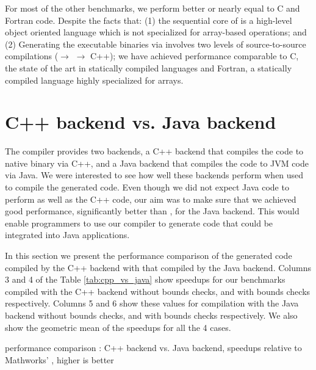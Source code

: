For most of the other benchmarks, we perform better or nearly equal to C and
Fortran code. Despite the facts that: (1) the sequential core of \xten is a
high-level object oriented language which is not specialized for array-based
operations; and (2) Generating the executable binaries via \mixten involves two
levels of source-to-source compilations (\matlab $\rightarrow$ \xten
$\rightarrow$ C++); we have achieved performance comparable to C, the state of
the art in statically compiled languages and Fortran, a statically compiled
language highly specialized for arrays.
       
\section{\xten C++ backend vs. \xten Java backend}

The \xten compiler provides two backends, a C++ backend that compiles the \xten
code to native binary via C++, and a Java backend that compiles the \xten code
to JVM code via Java. We were interested to see how well these backends perform
when used to compile the \mixten generated code. Even though we did not expect
Java code to perform as well as the C++ code, our aim was to make sure that we
achieved good performance, significantly better than \matlab, for the \xten
Java backend.  This would enable \matlab programmers to use our \mixten
compiler to generate code that could be integrated into Java applications. 

In this section we present the performance comparison of the \mixten
generated \xten code compiled by the \xten C++ backend with that compiled by
the \xten Java backend. Columns 3 and 4 of the Table \ref{tab:cpp_vs_java} show
speedups for our benchmarks compiled with the \xten C++ backend without bounds
checks, and with bounds checks respectively. Columns 5 and 6 show these values
for compilation with the \xten Java backend without bounds checks, and with
bounds checks respectively. We also show the geometric mean of the speedups for
all the 4 cases. 

\begin{table}[htbp]
\begin{center} 
\begin{footnotesize}

\end{footnotesize}
\caption{\mixten performance comparison : \xten C++ backend vs. \xten
Java backend, speedups relative to Mathworks' \matlab, higher is better} 
\label{tab:cpp_vs_java} 
\end{center} 
\end{table}

